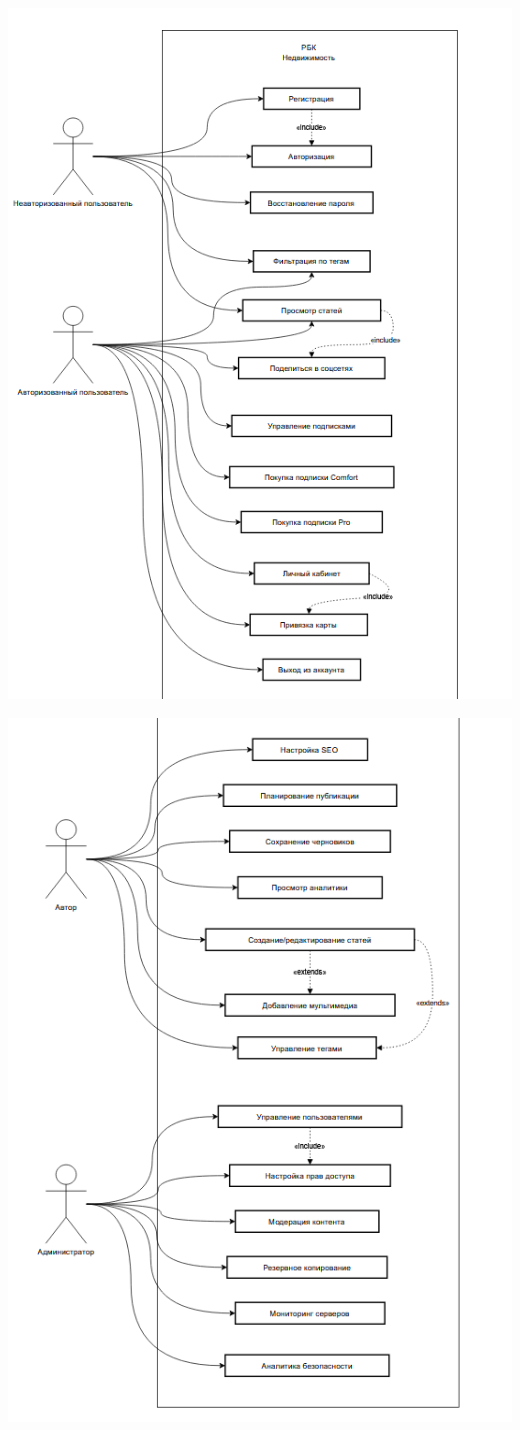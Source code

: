 \documentclass{scrreprt}
\begin{document}
\includegraphics[width=\textwidth, height=0.8\textheight]{g}

\includegraphics[width=\textwidth]{h}
\end{document}
